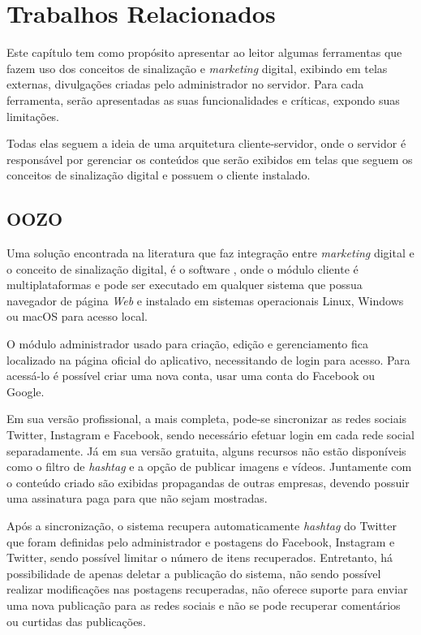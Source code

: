\chapter[Trabalhos Relacionados]{Trabalhos Relacionados}
\label{relacionados}
Este capítulo tem como propósito apresentar ao leitor algumas ferramentas que fazem uso dos conceitos de sinalização e \textit{marketing} digital, exibindo em telas externas, divulgações criadas pelo administrador no servidor. Para cada ferramenta, serão apresentadas as suas funcionalidades e críticas, expondo suas limitações.

Todas elas seguem a ideia de uma arquitetura cliente-servidor, onde o servidor é responsável por gerenciar os conteúdos que serão exibidos em telas que seguem os conceitos de sinalização digital e possuem o cliente instalado.

\section{OOZO}
\label{sec:oozo}
Uma solução encontrada na literatura que faz integração entre \textit{marketing} digital e o conceito de sinalização digital, é o software \cite{oozo2017}, onde o módulo cliente é multiplataformas e pode ser executado em qualquer sistema que possua navegador de página \textit{Web} e instalado em sistemas operacionais Linux, Windows ou macOS para acesso local.

O módulo administrador usado para criação, edição e gerenciamento fica localizado na página oficial do aplicativo, necessitando de login para acesso. Para acessá-lo é possível criar uma nova conta, usar uma conta do Facebook ou Google. 

Em sua versão profissional, a mais completa, pode-se sincronizar as redes sociais Twitter, Instagram e Facebook, sendo necessário efetuar login em cada rede social separadamente. Já em sua versão gratuita, alguns recursos não estão disponíveis como o filtro de \textit{hashtag} e a opção de publicar imagens e vídeos. Juntamente com o conteúdo criado são exibidas propagandas de outras empresas, devendo possuir uma assinatura paga para que não sejam mostradas.

Após a sincronização, o sistema recupera automaticamente \textit{hashtag} do Twitter que foram definidas pelo administrador e postagens do Facebook, Instagram e Twitter, sendo possível limitar o número de itens recuperados. Entretanto, há possibilidade de apenas deletar a publicação do sistema, não sendo possível realizar modificações nas postagens recuperadas, não oferece suporte para enviar uma nova publicação para as redes sociais e não se pode recuperar comentários ou curtidas das publicações.


